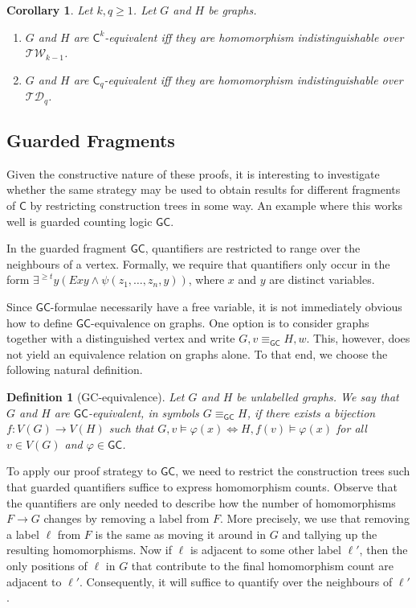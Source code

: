 \documentclass[10pt,a4paper]{article}
\newtheorem{corollary}[theorem]{Corollary}
\newtheorem{definition}[theorem]{Definition}
\newcommand{\lC} {\ensuremath{\mathsf C}}
\newcommand{\lGC}{\ensuremath{\mathsf{GC}}}
\begin{document}
    \begin{corollary}
  	Let $k, q \geq 1$. Let $G$ and $H$ be graphs.
  	\begin{enumerate}
  		\item $G$ and $H$ are $\lC^k$-equivalent iff they are homomorphism indistinguishable over $\mathcal{TW}_{k-1}$.
  		\item $G$ and $H$ are $\lC_q$-equivalent iff they are homomorphism indistinguishable over $\mathcal{TD}_q$.
  	\end{enumerate}
      \end{corollary}

 
\subsection{Guarded Fragments}
\label{subsec:gckq}
Given the constructive nature of these proofs, it is interesting to investigate whether the same strategy may be used to obtain results for different fragments of $\lC$ by restricting construction trees in some way. An example where this works well is guarded counting logic $\lGC$.

In the guarded fragment $\lGC$, quantifiers are restricted to range over the neighbours of a vertex. Formally, we require that quantifiers only occur in the form $\exists^{\geq t}y (Exy \land \psi(z_1, \dots, z_n, y))$, where $x$ and $y$ are distinct variables.

Since $\lGC$-formulae necessarily have a free variable, it is not immediately obvious how to define $\lGC$-equivalence on graphs. One option is to consider graphs together with a distinguished vertex and write $G, v \equiv_\lGC H, w$. This, however, does not yield an equivalence relation on graphs alone. To that end, we choose the following natural definition.

\begin{definition}[\textsf{GC}-equivalence]\label{def:gcequiv}
  Let $G$ and $H$ be unlabelled graphs. We say that $G$ and $H$ are $\textsf{GC}$-equivalent, in symbols $G \equiv_{\mathsf{GC}} H$, if there exists a bijection $f \colon V(G) \to V(H)$ such that $G, v \models \varphi(x) \iff H, f(v) \models \varphi(x)$ for all $v \in V(G)$ and $\varphi \in \mathsf{GC}$.
\end{definition}

To apply our proof strategy to $\lGC$, we need to restrict the construction trees such that guarded quantifiers suffice to express homomorphism counts. Observe that the quantifiers are only needed to describe how the number of homomorphisms $F \to G$ changes by removing a label from $F$. More precisely, we use that removing a label $\ell$ from $F$ is the same as moving it around in $G$ and tallying up the resulting homomorphisms. Now if $\ell$ is adjacent to some other label $\ell'$, then the only positions of $\ell$ in $G$ that contribute to the final homomorphism count are adjacent to $\ell'$. Consequently, it will suffice to quantify over the neighbours of $\ell'$.
\end{document}
